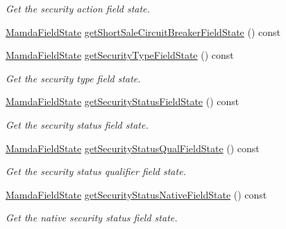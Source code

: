 \begin{CompactItemize}
\begin{CompactList}\small\item\em Get the security action field state. \item\end{CompactList}\item 
\hyperlink{namespaceWombat_93aac974f2ab713554fd12a1fa3b7d2a}{Mamda\-Field\-State} \hyperlink{classWombat_1_1MamdaSecStatusListener_a6bf492643a4963d80cdc05134955358}{get\-Short\-Sale\-Circuit\-Breaker\-Field\-State} () const 
\item 
\hyperlink{namespaceWombat_93aac974f2ab713554fd12a1fa3b7d2a}{Mamda\-Field\-State} \hyperlink{classWombat_1_1MamdaSecStatusListener_61d631913cca79d7919a225c9d42e5d1}{get\-Security\-Type\-Field\-State} () const 
\begin{CompactList}\small\item\em Get the security type field state. \item\end{CompactList}\item 
\hyperlink{namespaceWombat_93aac974f2ab713554fd12a1fa3b7d2a}{Mamda\-Field\-State} \hyperlink{classWombat_1_1MamdaSecStatusListener_f5a0928dfb229b6c39fd64c07628d37a}{get\-Security\-Status\-Field\-State} () const 
\begin{CompactList}\small\item\em Get the security status field state. \item\end{CompactList}\item 
\hyperlink{namespaceWombat_93aac974f2ab713554fd12a1fa3b7d2a}{Mamda\-Field\-State} \hyperlink{classWombat_1_1MamdaSecStatusListener_96338fb8e8ae1b6ab9d8ca695f711925}{get\-Security\-Status\-Qual\-Field\-State} () const 
\begin{CompactList}\small\item\em Get the security status qualifier field state. \item\end{CompactList}\item 
\hyperlink{namespaceWombat_93aac974f2ab713554fd12a1fa3b7d2a}{Mamda\-Field\-State} \hyperlink{classWombat_1_1MamdaSecStatusListener_6ceb039c9b33e50e458383e108670f67}{get\-Security\-Status\-Native\-Field\-State} () const 
\begin{CompactList}\small\item\em Get the native security status field state. \item\end{CompactList}\item 

\end{CompactItemize}
